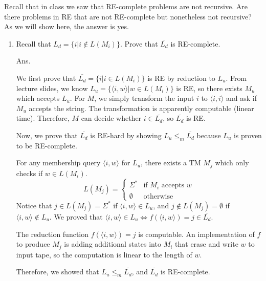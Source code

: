 \documentclass[11pt]{homework}
\begin{document}
\maketitle


\question
 Recall that in class we saw that RE-complete problems are not recursive.
 Are there problems in RE that are not RE-complete but nonetheless not recursive?
 As we will show here, the answer is yes.
\begin{enumerate}[label=(\alph*)]
  \item
    Recall that \(L_d = \{i|i\not\in L(M_i)\}\).
    Prove that \(\overline{L_d}\) is RE-complete.
    
Ans.
  
We first prove that \(\overline{L_d} = \{i|i \in L(M_i)\}\) is RE by reduction to \(L_u\).
From lecture slides, we know \(L_u = \{\langle i,w\rangle|w \in L(M_i)\}\) is RE,
so there exists \(M_u\) which accepts \(L_u\).
For \(M\), we simply transform the input \(i\) to \(\langle i,i\rangle\)
and ask if \(M_u\) accepts the string.
The transformation is apparently computable (linear time).
Therefore, \(M\) can decide whether \(i \in \overline{L_d}\),
so \(\overline{L_d}\) is RE.

Now, we prove that \(\overline{L_d}\) is RE-hard by showing \(L_u \leq_m \overline{L_d}\) because \(L_u\) is proven to be RE-complete.

For any membership query \(\langle i, w\rangle\) for \(L_u\),
there exists a TM \(M_j\) which only checks if \(w \in L(M_i)\).
\[
  L(M_j) =
  \begin{cases}
    \Sigma^* & \text{if } M_i \text{ accepts } w\\
    \emptyset & \text{otherwise}
  \end{cases}
\]
Notice that \(j \in L(M_j) = \Sigma^*\) if \(\langle i, w\rangle \in L_u\), and \(j \not\in L(M_j) = \emptyset\) if \(\langle i, w\rangle \not\in L_u\).
We proved that \(\langle i, w\rangle \in L_u \Leftrightarrow f(\langle i, w\rangle) = j \in \overline{L_d}\).

The reduction function \(f(\langle i, w\rangle) = j\) is computable.
An implementation of \(f\) to produce \(M_j\) is adding additional states into \(M_i\)
that erase and write \(w\) to input tape,
so the computation is linear to the length of \(w\).

Therefore, we showed that \(L_u \leq_m \overline{L_d}\), and \(\overline{L_d}\) is RE-complete.

\end{enumerate}
\end{document}
